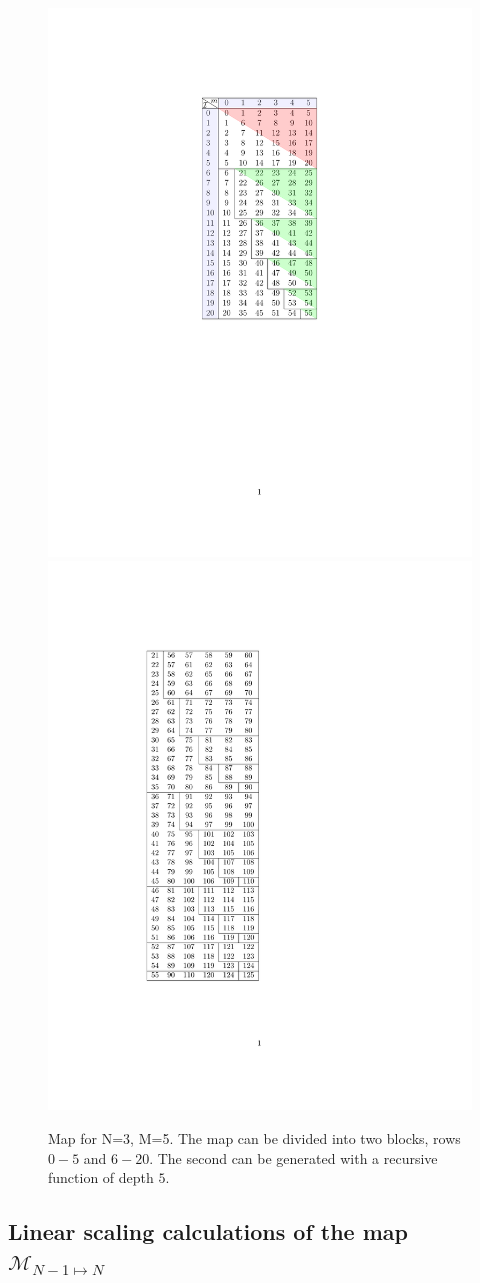 \documentclass[final,twocolumn]{elsarticle}
\newcommand{\maptoN}{{{\mathcal{M}}}_{N-1 \mapsto N}}
\begin{document}
\begin{small}
\begin{figure}[h]
\centering
\includegraphics[width=0.55\columnwidth]{fig-map}
\includegraphics[width=0.35\columnwidth]{fig-n-4-1col}
\caption{  Map for N=3, M=5.
The map can be divided into two blocks, rows $0-5$ and $6-20$.
The second can be generated with a recursive function of depth $5$.
 \label{fig:map}
 }
\end{figure}

\subsection{Linear scaling calculations of the map $\maptoN$}

\end{small}
\end{document}
